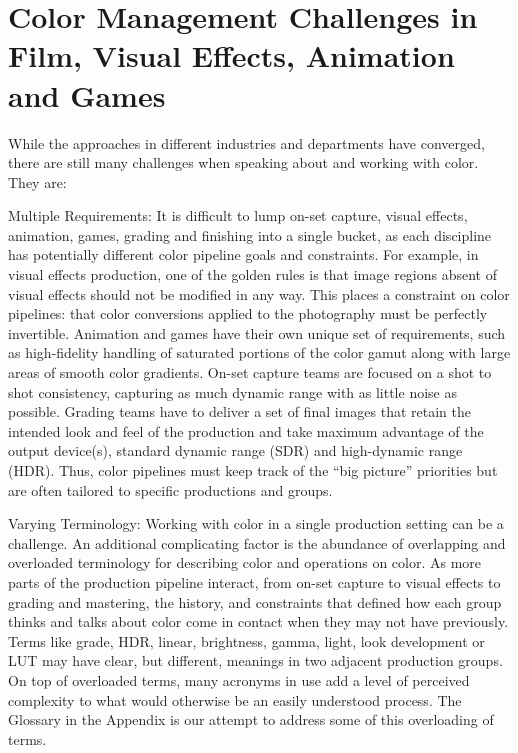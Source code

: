 \section{Color Management Challenges in Film, Visual Effects, Animation and Games}

While the approaches in different industries and departments have converged, there are still many challenges when speaking about and working with color. They are:

Multiple Requirements: It is difficult to lump on-set capture, visual effects, animation, games, grading and finishing into a single bucket, as each discipline has potentially different color pipeline goals and constraints. For example, in visual effects production, one of the golden rules is that image regions absent of visual effects should not be modified in any way. This places a constraint on color pipelines: that color conversions applied to the photography must be perfectly invertible. Animation and games have their own unique set of requirements, such as high-fidelity handling of saturated portions of the color gamut along with large areas of smooth color gradients. On-set capture teams are focused on a shot to shot consistency, capturing as much dynamic range with as little noise as possible. Grading teams have to deliver a set of final images that retain the intended look and feel of the production and take maximum advantage of the output device(s), standard dynamic range (SDR) and high-dynamic range (HDR). Thus, color pipelines must keep track of the “big picture” priorities but are often tailored to specific productions and groups.

Varying Terminology: Working with color in a single production setting can be a challenge. An additional complicating factor is the abundance of overlapping and overloaded terminology for describing color and operations on color. As more parts of the production pipeline interact, from on-set capture to visual effects to grading and mastering, the history, and constraints that defined how each group thinks and talks about color come in contact when they may not have previously. Terms like grade, HDR, linear, brightness, gamma, light, look development or LUT may have clear, but different, meanings in two adjacent production groups. On top of overloaded terms, many acronyms in use add a level of perceived complexity to what would otherwise be an easily understood process. The Glossary in the Appendix is our attempt to address some of this overloading of terms.

